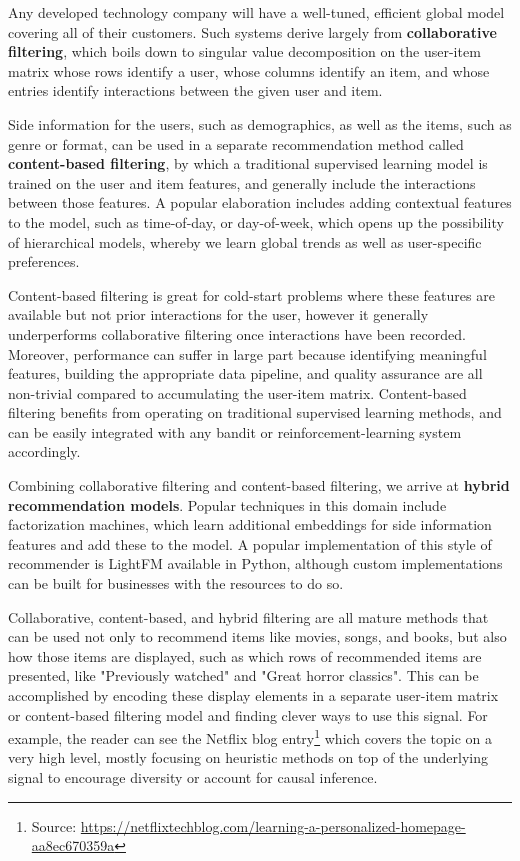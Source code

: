 \documentclass[manuscript, nonacm, screen=true]{acmart}
\begin{document}
Any developed technology company will have a well-tuned, efficient global model covering all of their customers. Such systems derive largely from \textbf{collaborative filtering}\cite{CF_survey1, CF_survey2, CF_survey3}, which boils down to singular value decomposition on the user-item matrix whose rows identify a user, whose columns identify an item, and whose entries identify interactions between the given user and item.

Side information for the users, such as demographics, as well as the items, such as genre or format, can be used in a separate recommendation method called \textbf{content-based filtering}, by which a traditional supervised learning model is trained on the user and item features, and generally include the interactions between those features. A popular elaboration includes adding contextual features to the model, such as time-of-day, or day-of-week, which opens up the possibility of hierarchical models, whereby we learn global trends as well as user-specific preferences. 

Content-based filtering is great for cold-start problems where these features are available but not prior interactions for the user, however it generally underperforms collaborative filtering once interactions have been recorded. Moreover, performance can suffer in large part because identifying meaningful features, building the appropriate data pipeline, and quality assurance are all non-trivial compared to accumulating the user-item matrix. Content-based filtering benefits from operating on traditional supervised learning methods, and can be easily integrated with any bandit or reinforcement-learning system accordingly.

Combining collaborative filtering and content-based filtering, we arrive at \textbf{hybrid recommendation models}\cite{hybrid_recommender, hybrid_recommender2}. Popular techniques in this domain include factorization machines\cite{factorization_machines, deep_factorization_machines}, which learn additional embeddings for side information features and add these to the model. A popular implementation of this style of recommender is LightFM\cite{lightFM, xLightFM} available in Python, although custom implementations can be built for businesses with the resources to do so. 

Collaborative, content-based, and hybrid filtering are all mature methods that can be used not only to recommend items like movies, songs, and books, but also how those items are displayed, such as which rows of recommended items are presented, like "Previously watched" and "Great horror classics". This can be accomplished by encoding these display elements in a separate user-item matrix or content-based filtering model and finding clever ways to use this signal. For example, the reader can see the Netflix blog entry\footnote{Source: \url{https://netflixtechblog.com/learning-a-personalized-homepage-aa8ec670359a}} which covers the topic on a very high level, mostly focusing on heuristic methods on top of the underlying signal to encourage diversity or account for causal inference.
\end{document}
